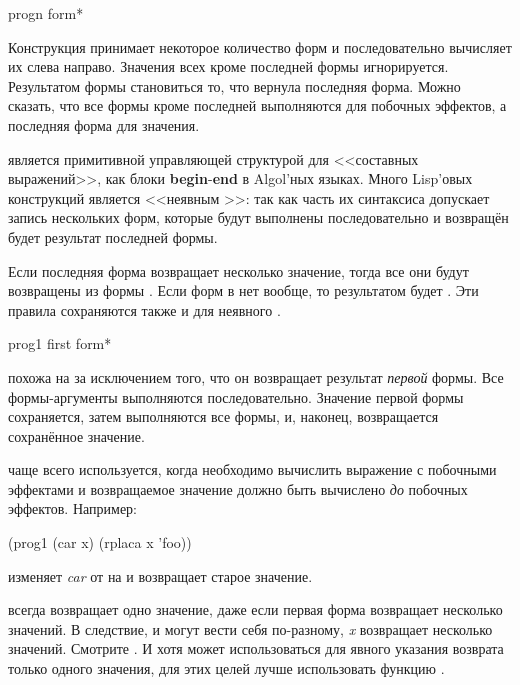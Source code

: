 \begin{defspec}
progn {form}*

Конструкция  принимает некоторое количество форм и последовательно
вычисляет их слева направо. Значения всех кроме последней формы
игнорируется. Результатом формы  становиться то, что вернула
последняя форма.
Можно сказать, что все формы кроме последней выполняются для побочных эффектов,
а последняя форма для значения.

 является примитивной управляющей структурой для <<составных
выражений>>, как блоки \textbf{begin}-\textbf{end} в Algol'ных языках.
Много Lisp'овых конструкций является <<неявным >>:
так как часть их синтаксиса допускает запись нескольких форм,
которые будут выполнены последовательно и возвращён будет результат последней
формы.

Если последняя форма  возвращает несколько значение, тогда все они
будут возвращены из формы . Если форм в  нет вообще, то
результатом будет {\false}. Эти правила сохраняются также и для неявного
.
\end{defspec}

\begin{defmac}
prog1 first {form}*

 похожа на  за исключением того, что он возвращает
результат \emph{первой} формы. Все формы-аргументы выполняются
последовательно. Значение первой формы сохраняется, затем выполняются все формы,
и, наконец, возвращается сохранённое значение.

 чаще всего используется, когда необходимо вычислить выражение с
побочными эффектами и возвращаемое значение должно быть вычислено \emph{до}
побочных эффектов.
Например:
\begin{lisp}
(prog1 (car x) (rplaca x 'foo))
\end{lisp}
изменяет \emph{car} от  на  и возвращает старое значение.

 всегда возвращает одно значение, даже если первая форма возвращает
несколько значений.
В следствие,  и  могут вести себя
по-разному, \emph{x} возвращает несколько значений. Смотрите .
И хотя  может использоваться для явного указания возврата только
одного значения, для этих целей лучше использовать функцию .
\end{defmac}


